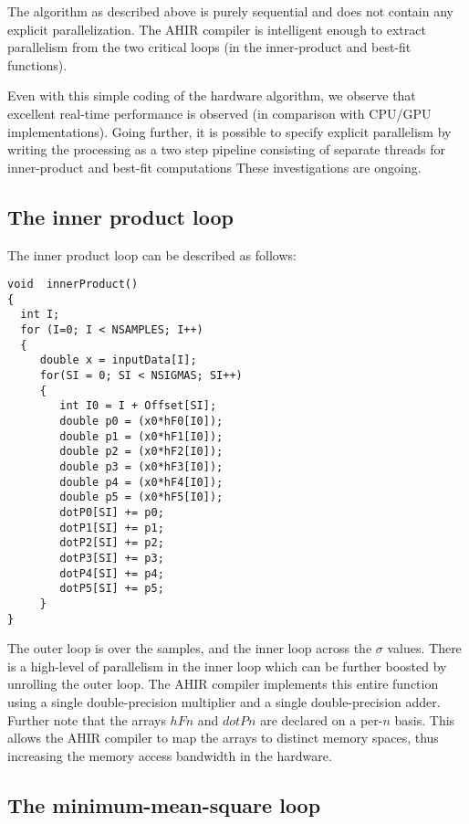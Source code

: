 \documentclass[runningheads]{llncs}
\begin{document}
The algorithm as described above is purely sequential
and does not contain any explicit parallelization.  The AHIR compiler
is intelligent enough to extract parallelism from the two critical
loops (in the inner-product and best-fit functions).

Even with this simple coding of the hardware algorithm,
we observe that excellent real-time performance
is observed (in comparison with CPU/GPU implementations).
Going further, it is possible to specify explicit parallelism by
writing the processing as a two step pipeline consisting
of separate threads for inner-product and best-fit
computations  These investigations are ongoing.



\subsection{The inner product loop} \label{sec:InnerProduct}

The inner product loop can be described as follows:
\begin{verbatim}
void  innerProduct()
{
  int I;
  for (I=0; I < NSAMPLES; I++)
  {
     double x = inputData[I];
     for(SI = 0; SI < NSIGMAS; SI++)
     {
        int I0 = I + Offset[SI];
        double p0 = (x0*hF0[I0]);
        double p1 = (x0*hF1[I0]);
        double p2 = (x0*hF2[I0]);
        double p3 = (x0*hF3[I0]);
        double p4 = (x0*hF4[I0]);
        double p5 = (x0*hF5[I0]);
        dotP0[SI] += p0;
        dotP1[SI] += p1;
        dotP2[SI] += p2;
        dotP3[SI] += p3;
        dotP4[SI] += p4;
        dotP5[SI] += p5;
     }
}
\end{verbatim}
The outer loop is over the samples, and the inner
loop across the $\sigma$ values.  There is a high-level
of parallelism in the inner loop which can be further
boosted by unrolling the outer loop.   The AHIR compiler
implements this entire function using a single double-precision
multiplier and a single double-precision adder.  Further
note that the arrays $hFn$ and $dotPn$ are declared on
a per-$n$ basis. This allows the AHIR compiler to
map the arrays to distinct memory spaces, thus increasing
the memory access bandwidth in the hardware.

\subsection{The minimum-mean-square loop} \label{sec:MMSE}
\end{document}
